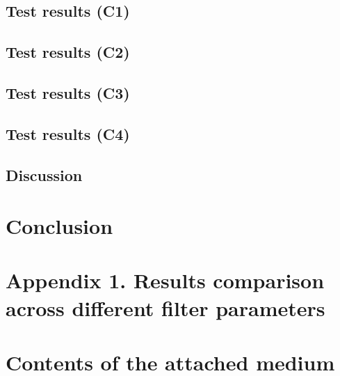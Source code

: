 \documentclass[english,master,unicode]{ctufit-thesis}
\theoremstyle{plain}
\theoremstyle{definition}
\theoremstyle{remark}
\numberwithin{theorem}{chapter}
\begin{document}
    \section{Test results (C1)}\label{sec:c1-results}
        
    \section{Test results (C2)}\label{sec:c2-results}
        
    \section{Test results (C3)}\label{sec:c3-results}
        
    \section{Test results (C4)}\label{sec:c4-results}
        
    \section{Discussion}\label{sec:discussion}
        

\chapter{Conclusion}


\appendix\appendixinit
\chapter{Appendix 1. Results comparison across different filter parameters}\label{appendix:results-figures}
    


\backmatter
\printbibliography


\chapter{Contents of the attached medium}
\end{document}
